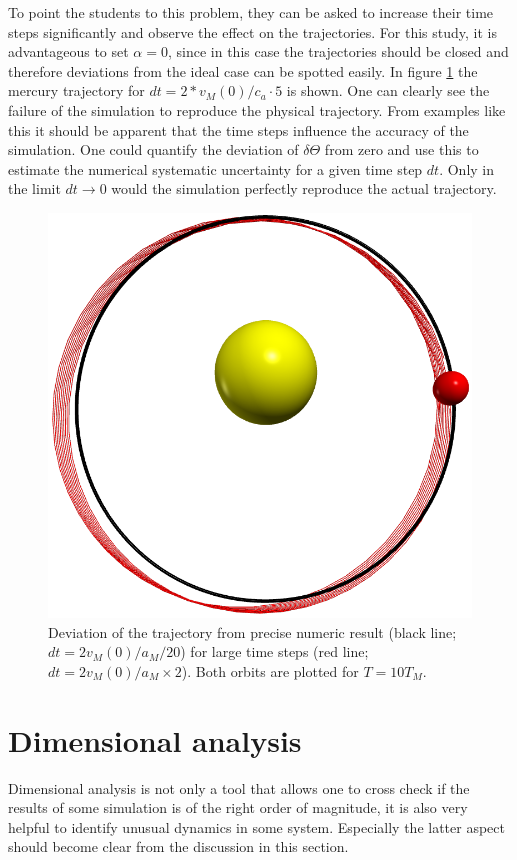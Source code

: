 \documentclass[12pt, UK english]{iopart}
\begin{document}
To point the students to this problem, they can be asked to increase their time steps significantly and observe the effect on the trajectories.
For this study, it is advantageous to set $\alpha =0$, since in this case the trajectories should be closed and therefore deviations from the ideal case can be spotted easily.
In figure \ref{fig: LargeDT} the mercury trajectory for $dt=2 * v_M(0) / c_a \cdot 5$ is shown.
One can clearly see the failure of the simulation to reproduce the physical trajectory.
From examples like this it should be apparent that the time steps influence the accuracy of the simulation.
One could quantify the deviation of $\delta\Theta$ from zero and use this to estimate the numerical systematic uncertainty for a given time step $dt$.
Only in the limit $dt \rightarrow 0$ would the simulation perfectly reproduce the actual trajectory.
\begin{figure}[htb]
	\centering
	\includegraphics[width=.5\textwidth]{figs/num-err.png}
	\caption{\label{fig: LargeDT}%
		Deviation of the trajectory from precise numeric result (black line; $dt=2 v_M(0) / a_M / 20$) for large time steps (red line; $dt=2 v_M(0) / a_M \times 2$).
		Both orbits are plotted for $T = 10 T_M$.
	}
\end{figure}

\section{Dimensional analysis}\label{sec:analysis}

Dimensional analysis is not only a tool that allows one to cross check if the results of some simulation is of the right order of magnitude, it is also very helpful to identify unusual dynamics in some system.
Especially the latter aspect should become clear from the discussion in this section.
\end{document}
